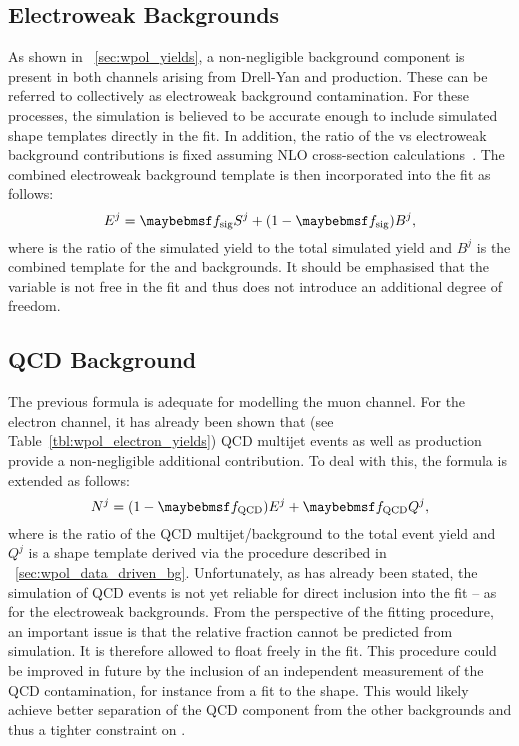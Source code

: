 \subsection{Electroweak Backgrounds}
As shown in \sec~\ref{sec:wpol_yields}, a non-negligible background component
is present in both channels arising from Drell-Yan and \ttbar production. These
can be referred to collectively as electroweak background contamination. For
these processes, the simulation is believed to be accurate enough to include
simulated \LP shape templates directly in the fit. In addition, the ratio of the
\Wjets vs electroweak background contributions is fixed assuming \ac{NLO}
cross-section
calculations~\cite{ellis_wp3jet,berger_wp4jet,heavy_quark,top_quark,drellyan}. The
combined electroweak background template is then incorporated into the fit as
follows:
\begin{equation*}
E^j = \fsig S^j + (1-\fsig) B^j,
\end{equation*}
where \fsig is the ratio of the simulated \Wjets yield to the total
simulated yield and $B^j$ is the combined \LP template for the \Zjets and \ttbar
backgrounds. It should be emphasised that the variable \fsig is not
free in the fit and thus does not introduce an additional degree of freedom.

\subsection{\acs{QCD} Background}
The previous formula is adequate for modelling the muon channel. For the
electron channel, it has already been shown that (see
Table~\ref{tbl:wpol_electron_yields}) \ac{QCD} multijet events as well as
\gammajets production provide a non-negligible additional contribution. To deal
with this, the formula is extended as follows:
\begin{equation*}
N^j = (1 - \fQCD) E^j + \fQCD Q^j,
\end{equation*}
where \fQCD is the ratio of the QCD multijet/\gammajets background
to the total event yield and $Q^j$ is a shape template derived via the procedure
described in \sec~\ref{sec:wpol_data_driven_bg}. Unfortunately, as has
already been stated, the simulation of QCD events is not yet reliable for direct
inclusion into the fit -- as for the electroweak backgrounds. From the
perspective of the fitting procedure, an important issue is that the relative
fraction \fQCD cannot be predicted from simulation. It is therefore
allowed to float freely in the fit. This procedure could be improved in future
by the inclusion of an independent measurement of the \ac{QCD} contamination,
for instance from a fit to the \MET shape. This would likely achieve better
separation of the \ac{QCD} component from the other backgrounds and thus a
tighter constraint on \fQCD.

